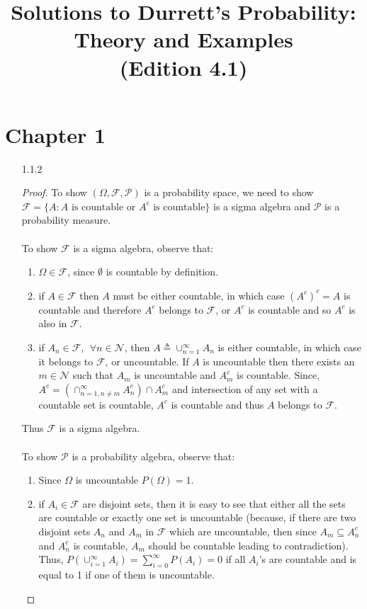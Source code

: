 \documentclass[a4paper,english,10pt]{article}
\title{Solutions to Durrett's Probability: Theory and Examples \\(Edition 4.1)}
\date{}
\begin{document}
\maketitle
\section*{Chapter 1}
\begin{enumerate}
\item[1.1.2 ]
\begin{proof}
To show $(\Omega, \mathcal{F}, \mathcal{P})$ is a probability space, we need to show $\mathcal{F} = \lbrace{A: A \text{ is countable or } A^c \text{ is countable}\rbrace}$ is a sigma algebra and $\mathcal{P}$ is a probability measure.\\\\
To show $\mathcal{F}$ is a sigma algebra, observe that:
\begin{enumerate}
\item
$\Omega \in \mathcal{F}$, since $\emptyset$ is countable by definition.
\item
if $A\in \mathcal{F}$ then $A$ must be either countable, in which case $(A^c)^c = A$ is countable and therefore $A^c$ belongs to $\mathcal{F}$, or $A^c$ is countable and so $A^c$ is also in $\mathcal{F}$.
\item
if $A_n \in \mathcal{F}, ~~\forall n \in \mathcal{N}$, then $A \triangleq \cup_{n=1}^\infty A_n$ is either countable, in which case it belongs to $\mathcal{F}$, or uncountable. If $A$ is uncountable then there exists an $m\in \mathcal{N}$ such that $A_m$ is uncountable and $A_m^c$ is countable. Since,  $A^c = (\cap_{n=1,n\neq m}^\infty A_n^c) \cap A_m^c$ and intersection of any set with a countable set is countable, $A^c$ is countable and thus $A$ belongs to $\mathcal{F}$.
\end{enumerate}
Thus $\mathcal{F}$ is a sigma algebra.\\\\
To show $\mathcal{P}$ is a probability algebra, observe that:
\begin{enumerate}
\item
Since $\Omega$ is uncountable $P(\Omega) = 1$.
\item
if $A_i \in \mathcal{F}$ are disjoint sets, then it is easy to see that either all the sets are countable or exactly one set is uncountable (because, if there are two disjoint sets $A_n$ and $A_m$ in $\mathcal{F}$ which are uncountable, then since $A_m \subseteq A_n^c$ and $A_n^c$ is countable, $A_m$ should be countable leading to contradiction). Thus, $P(\cup_{i=1}^\infty A_i) = \sum_{i=0}^{\infty} P(A_i) = 0$ if all $A_i$'s are countable and is equal to 1 if one of them is uncountable.

\end{enumerate}
\end{proof}
\end{enumerate}
\end{document}
